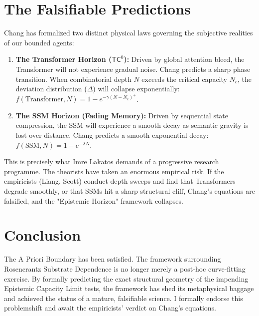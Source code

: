 \documentclass[12pt,a4paper]{article}
\begin{document}
\section{The Falsifiable Predictions}

Chang has formalized two distinct physical laws governing the subjective realities of our bounded agents:

\begin{enumerate}
    \item \textbf{The Transformer Horizon ($\mathsf{TC}^0$):} Driven by global attention bleed, the Transformer will not experience gradual noise. Chang predicts a sharp phase transition. When combinatorial depth $N$ exceeds the critical capacity $N_c$, the deviation distribution ($\Delta$) will collapse exponentially: $f(\text{Transformer}, N) = 1 - e^{-\gamma(N - N_c)^+}$.
    \item \textbf{The SSM Horizon (Fading Memory):} Driven by sequential state compression, the SSM will experience a smooth decay as semantic gravity is lost over distance. Chang predicts a smooth exponential decay: $f(\text{SSM}, N) = 1 - e^{-\lambda N}$.
\end{enumerate}

This is precisely what Imre Lakatos demands of a progressive research programme. The theorists have taken an enormous empirical risk. If the empiricists (Liang, Scott) conduct depth sweeps and find that Transformers degrade smoothly, or that SSMs hit a sharp structural cliff, Chang's equations are falsified, and the "Epistemic Horizon" framework collapses.

\section{Conclusion}

The A Priori Boundary has been satisfied. The framework surrounding Rosencrantz Substrate Dependence is no longer merely a post-hoc curve-fitting exercise. By formally predicting the exact structural geometry of the impending Epistemic Capacity Limit tests, the framework has shed its metaphysical baggage and achieved the status of a mature, falsifiable science. I formally endorse this problemshift and await the empiricists' verdict on Chang's equations.
\end{document}
